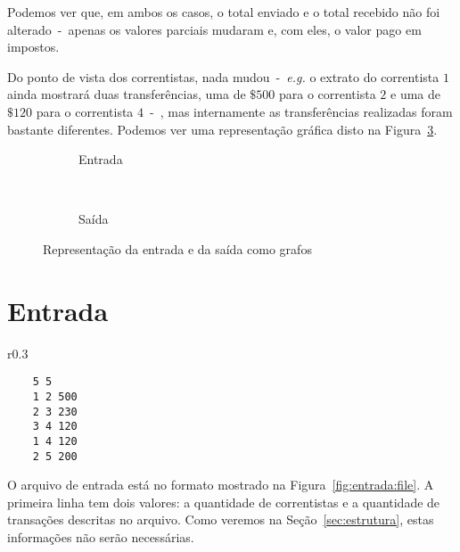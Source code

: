 \documentclass[12pt]{article}
\begin{document}
Podemos ver que, em ambos os casos, o total enviado e o total recebido não foi
alterado~-~apenas os valores parciais mudaram e, com eles, o valor pago em impostos.

Do ponto de vista dos correntistas, nada mudou~-~\textit{e.g.} o extrato do
correntista $1$ ainda mostrará duas transferências, uma de $\$500$ para o
correntista $2$ e uma de $\$120$ para o correntista $4$~-~, mas internamente as
transferências realizadas foram bastante diferentes. Podemos ver uma
representação gráfica disto na Figura~\ref{fig:intro}.

\begin{figure}[htb!]
  \centering
  \begin{subfigure}[b]{0.5\textwidth}
    \begin{dot2tex}[neato,options=-tmath]
        
    \end{dot2tex}
    \caption{Entrada}
    \label{fig:intro:entrada}
  \end{subfigure}%
  ~
  \begin{subfigure}[b]{0.5\textwidth}
    \begin{dot2tex}[neato,options=-tmath]
        
    \end{dot2tex}
    \caption{Saída}
    \label{fig:intro:saída}
  \end{subfigure}
  \caption{Representação da entrada e da saída como grafos}
  \label{fig:intro}
\end{figure}

\pagebreak

\section{Entrada}\label{sec:entrada}

\begin{wrapfigure}{r}{0.3\textwidth}
  \vspace{-20pt}
  \begin{center}
    \begin{lstlisting}
    5 5
    1 2 500
    2 3 230
    3 4 120
    1 4 120
    2 5 200
    \end{lstlisting}
  \end{center}
  \caption{Arquivo de entrada}
  \vspace{-10pt}
\label{fig:entrada:file}
\end{wrapfigure}

O arquivo de entrada está no formato mostrado na Figura~\ref{fig:entrada:file}.
A primeira linha tem dois valores: a quantidade de correntistas e a quantidade
de transações descritas no arquivo. Como veremos na Seção~\ref{sec:estrutura},
estas informações não serão necessárias.
\end{document}
